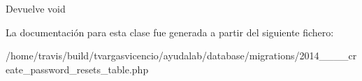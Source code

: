 \begin{DoxyReturn}{\-Devuelve}
void 
\end{DoxyReturn}


\-La documentación para esta clase fue generada a partir del siguiente fichero\-:\begin{DoxyCompactItemize}
\item 
/home/travis/build/tvargasvicencio/ayudalab/database/migrations/2014\-\_\-\_\-\_\-\_\-create\-\_\-password\-\_\-resets\-\_\-table.\-php\end{DoxyCompactItemize}

